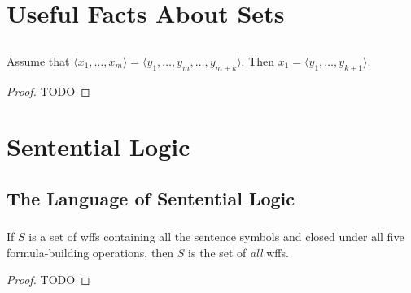 \documentclass{report}
\begin{document}
\endgroup

\setcounter{chapter}{0}
\addtocounter{chapter}{-1}
\chapter{Useful Facts About Sets}%

\section{}%

\begin{lemma}[0A]

Assume that $\langle x_1, \ldots, x_m \rangle =
  \langle y_1, \ldots, y_m, \ldots, y_{m+k} \rangle$.
Then $x_1 = \langle y_1, \ldots, y_{k+1} \rangle$.

\end{lemma}

\begin{proof}

  TODO

\end{proof}

\chapter{Sentential Logic}%

\section{The Language of Sentential Logic}%

\subsection{}%

\begin{theorem}

If $S$ is a set of wffs containing all the sentence symbols and closed under all
  five formula-building operations, then $S$ is the set of \textit{all} wffs.

\end{theorem}

\begin{proof}

  TODO

\end{proof}
\end{document}
